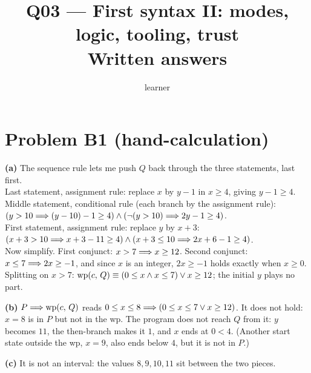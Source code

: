\documentclass[11pt]{article}
\title{Q03 --- First syntax II: modes, logic, tooling, trust \\ \large Written answers}
\author{learner}
\date{}
\begin{document}
\maketitle

\section*{Problem B1 (hand-calculation)}\label{ans:B1}
\begin{answer}
\textbf{(a)} The sequence rule lets me push $Q$ back through the three
statements, last first. \\
Last statement, assignment rule: replace $x$ by $y - 1$ in $x \geq 4$, giving
$y - 1 \geq 4$. \\
Middle statement, conditional rule (each branch by the assignment rule):
$(y > 10 \Longrightarrow (y - 10) - 1 \geq 4) \wedge (\neg(y > 10) \Longrightarrow 2y - 1 \geq 4)$. \\
First statement, assignment rule: replace $y$ by $x + 3$:
$(x + 3 > 10 \Longrightarrow x + 3 - 11 \geq 4) \wedge (x + 3 \leq 10 \Longrightarrow 2x + 6 - 1 \geq 4)$. \\
Now simplify. First conjunct: $x > 7 \Longrightarrow x \geq 12$. Second conjunct:
$x \leq 7 \Longrightarrow 2x \geq -1$, and since $x$ is an integer, $2x \geq -1$ holds
exactly when $x \geq 0$. Splitting on $x > 7$:
$\mathrm{wp}(c,\,Q) \equiv (0 \leq x \wedge x \leq 7) \vee x \geq 12$; the initial
$y$ plays no part.

\textbf{(b)} $P \Longrightarrow \mathrm{wp}(c,\,Q)$ reads
$0 \leq x \leq 8 \Longrightarrow (0 \leq x \leq 7 \vee x \geq 12)$. It does not hold:
$x = 8$ is in $P$ but not in the wp. The program does not reach $Q$ from it:
$y$ becomes $11$, the then-branch makes it $1$, and $x$ ends at $0 < 4$.
(Another start state outside the wp, $x = 9$, also ends below $4$, but it is not
in $P$.)

\textbf{(c)} It is not an interval: the values $8, 9, 10, 11$ sit between the
two pieces.
\end{answer}

\end{document}
